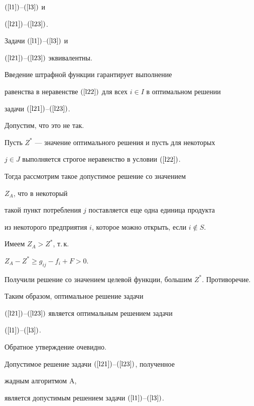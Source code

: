 $(\ref{l1})$--$(\ref{l3})$ и


$(\ref{l21})$--$(\ref{l23})$.





\begin{lem}


\label{l4}


Задачи $(\ref{l1})$--$(\ref{l3})$ и 


$(\ref{l21})$--$(\ref{l23})$ эквивалентны.


\end{lem}





\begin{pf}


Введение штрафной функции гарантирует выполнение


равенства в неравенстве $(\ref{l22})$ для всех $i\in I$ в оптимальном решении


задачи $(\ref{l21})$--$(\ref{l23})$.


Допустим, что это не так. 


Пусть $Z^*$ --- значение оптимального решения и пусть для некоторых


$j \in J$ выполняется строгое неравенство в условии $(\ref{l22})$.


Тогда рассмотрим такое допустимое решение со значением 


$Z_A$, что в некоторый 


такой пункт потребления $j$ поставляется еще одна единица продукта 


из некоторого предприятия $i$, которое можно открыть, если $i \notin S$.


Имеем $Z_A > Z^*$, т.\,к.


$Z_A - Z^* \ge g_{ij} -f_i +F > 0$.


Получили решение со значением целевой функции, большим $Z^*$. Противоречие.


Таким образом, оптимальное решение задачи 


$(\ref{l21})$--$(\ref{l23})$ является оптимальным решением задачи


$(\ref{l1})$--$(\ref{l3})$.


Обратное утверждение очевидно. 


\end{pf}





\begin{lem}


\label{l41}


Допустимое решение задачи $(\ref{l21})$--$(\ref{l23})$, полученное 


жадным алгоритмом $\mathrm A$,


является допустимым решением задачи $(\ref{l1})$--$(\ref{l3})$.


\end{lem}





